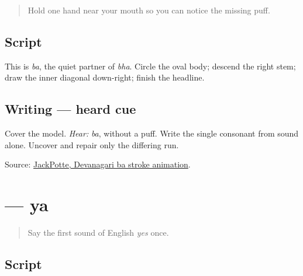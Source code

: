 \label{lesson:MR-W03-ba}



\begin{quote}
Hold one hand near your mouth so you can notice the missing puff.
\end{quote}

\subsection*{Script}

\begin{quote}
\end{quote}

This is \emph{ba}, the quiet partner of \emph{bha}. Circle the oval body; descend the right stem; draw the inner diagonal down-right; finish the headline.

\subsection*{Writing — heard cue}
Cover the model. \emph{Hear:} \emph{ba}, without a puff. Write the single consonant from sound alone. Uncover \textbf{} and repair only the differing run.

\begin{tcolorbox}[breakable,colback=teal!4,colframe=teal!35!black,title={Before you move on}]
Source: \href{https://commons.wikimedia.org/wiki/File:Devanagari\_b\_\%E0\%A4\%AC.gif}{JackPotte, Devanagari ba stroke animation}.
\end{tcolorbox}
\section[\texorpdfstring{\mr{य} (ya)}{य (ya)}]{ — ya}

\label{lesson:MR-W03-ya}



\begin{quote}
Say the first sound of English \emph{yes} once.
\end{quote}

\subsection*{Script}

